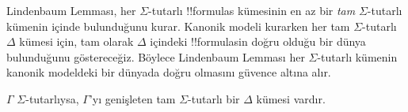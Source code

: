 



Lindenbaum Lemması, her $\Sigma$-tutarlı !!{formula}s kümesinin en az bir
\emph{tam} $\Sigma$-tutarlı kümenin içinde bulunduğunu kurar. Kanonik modeli
kurarken her tam $\Sigma$-tutarlı $\Delta$ kümesi için, tam olarak
$\Delta$ içindeki !!{formula}s{}in doğru olduğu bir dünya bulunduğunu
göstereceğiz. Böylece Lindenbaum Lemması her $\Sigma$-tutarlı kümenin
kanonik modeldeki bir dünyada doğru olmasını güvence altına alır.

\begin{thm}
  $\Gamma$ $\Sigma$-tutarlıysa, $\Gamma$'yı genişleten tam
  $\Sigma$-tutarlı bir $\Delta$ kümesi vardır.
\end{thm}

